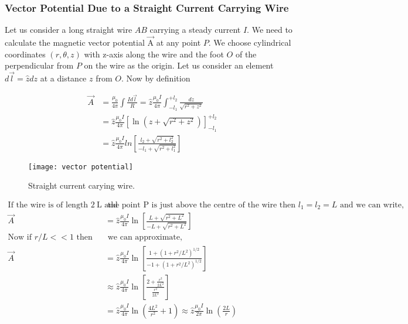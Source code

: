 \subsubsection{Vector Potential Due to a Straight Current Carrying Wire}
Let us consider a long straight wire $A B$ carrying a steady current $I$. We need to calculate the magnetic vector potential $\vec{\mathrm{A}}$ at any point $P .$ We choose cylindrical coordinates $(r, \theta, z)$ with z-axis along the wire and the foot $O$ of the perpendicular from $P$ on the wire as the origin. Let us consider an element $d \vec{l}=\hat{z} d z$ at a distance $z$ from $O$. Now by definition\\
\begin{minipage}{0.65\textwidth}
\begin{align*}
\vec{A}&=\frac{\mu_{0}}{4 \pi} \int \frac{I d \vec{l}}{R}=\hat{z} \frac{\mu_{0} I}{4 \pi} \int_{-l_{1}}^{+l_{2}} \frac{d z}{\sqrt{r^{2}+z^{2}}}\\&=\hat{z} \frac{\mu_{0} I}{4 \pi}\left[\ln \left(z+\sqrt{r^{2}+z^{2}}\right)\right]_{-l_{1}}^{+l_{2}}\\
&=\hat{z} \frac{\mu_{0} I}{4 \pi} l n\left[\frac{l_{2}+\sqrt{r^{2}+l_{2}^{2}}}{-l_{1}+\sqrt{r^{2}+l_{1}^{2}}}\right]
\end{align*}
\end{minipage}
\begin{minipage}{0.35\textwidth}
	\begin{figure}[H]
		\centering
		\texttt{[image: vector potential]}
		\caption{Straight current carying wire.}
		\label{Straight current carying wire.}
	\end{figure}
\end{minipage}
\begin{align*}
\text{If the wire is of length $2 \mathrm{~L}$ and}&\text{  the point $\mathrm{P}$ is just above the centre of the wire then $l_{1}=l_{2}=L$ and we can write,}\\
\vec{A}&=\hat{z} \frac{\mu_{0} I}{4 \pi} \ln \left[\frac{L+\sqrt{r^{2}+L^{2}}}{-L+\sqrt{r^{2}+L^{2}}}\right]\\
\text{Now if $r / L<<1$ then }&\text{ we can approximate,}\\
\vec{A}&=\hat{z} \frac{\mu_{0} I}{4 \pi} \ln \left[\frac{1+\left(1+r^{2} / L^{2}\right)^{1 / 2}}{-1+\left(1+r^{2} / L^{2}\right)^{1 / 2}}\right]\\
&\approx \hat{z} \frac{\mu_{0} I}{4 \pi} \ln \left[\frac{2+\frac{r^{2}}{2 L^{2}}}{\frac{r^2}{2L^2}}\right]\\
&=\hat{z} \frac{\mu_{0} I}{4 \pi} \ln \left(\frac{4 L^{2}}{r^{2}}+1\right) \approx \hat{z} \frac{\mu_{0} I}{2 \pi} \ln \left(\frac{2 L}{r}\right)
\end{align*}


